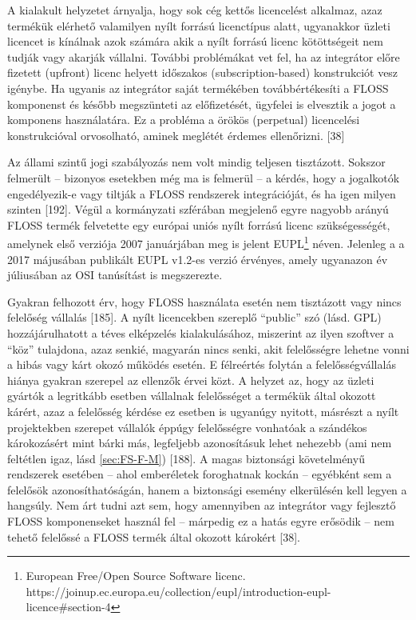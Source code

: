 \documentclass[12pt,magyar,a4paper,oneside]{scrreprt}
\begin{document}
A kialakult helyzetet árnyalja, hogy sok cég kettős licencelést
alkalmaz, azaz termékük elérhető valamilyen nyílt forrású licenctípus
alatt, ugyanakkor üzleti licencet is kínálnak azok számára akik a nyílt
forrású licenc kötöttségeit nem tudják vagy akarják vállalni. További
problémákat vet fel, ha az integrátor előre fizetett (upfront) licenc
helyett időszakos (subscription-based) konstrukciót vesz igénybe. Ha
ugyanis az integrátor saját termékében továbbértékesíti a FLOSS
komponenst és később megszünteti az előfizetését, ügyfelei is elvesztik
a jogot a komponens használatára. Ez a probléma a örökös (perpetual)
licencelési konstrukcióval orvosolható, aminek meglétét érdemes
ellenőrizni. {[}38{]}

Az állami szintű jogi szabályozás nem volt mindig teljesen tisztázott.
Sokszor felmerült -- bizonyos esetekben még ma is felmerül -- a kérdés,
hogy a jogalkotók engedélyezik-e vagy tiltják a FLOSS rendszerek
integrációját, és ha igen milyen szinten {[}192{]}. Végül a kormányzati
szférában megjelenő egyre nagyobb arányú FLOSS termék felvetette egy
európai uniós nyílt forrású licenc szükségességét, amelynek első
verziója 2007 januárjában meg is jelent EUPL\footnote{European Free/Open
  Source Software licenc.
  https://joinup.ec.europa.eu/collection/eupl/introduction-eupl-licence\#section-4}
néven. Jelenleg a a 2017 májusában publikált EUPL v1.2-es verzió
érvényes, amely ugyanazon év júliusában az OSI tanúsítást is
megszerezte.

Gyakran felhozott érv, hogy FLOSS használata esetén nem tisztázott vagy
nincs felelőség vállalás {[}185{]}. A nyílt licencekben szereplő
``public'' szó (lásd. GPL) hozzájárulhatott a téves elképzelés
kialakulásához, miszerint az ilyen szoftver a ``köz'' tulajdona, azaz
senkié, magyarán nincs senki, akit felelősségre lehetne vonni a hibás
vagy kárt okozó működés esetén. E félreértés folytán a
felelősségvállalás hiánya gyakran szerepel az ellenzők érvei közt. A
helyzet az, hogy az üzleti gyártók a legritkább esetben vállalnak
felelősséget a termékük által okozott kárért, azaz a felelősség kérdése
ez esetben is ugyanúgy nyitott, másrészt a nyílt projektekben szerepet
vállalók éppúgy felelősségre vonhatóak a szándékos károkozásért mint
bárki más, legfeljebb azonosításuk lehet nehezebb (ami nem feltétlen
igaz, lásd \ref{sec:FS-F-M}) {[}188{]}. A magas biztonsági követelményű
rendszerek esetében -- ahol emberéletek foroghatnak kockán -- egyébként
sem a felelősök azonosíthatóságán, hanem a biztonsági esemény
elkerülésén kell legyen a hangsúly. Nem árt tudni azt sem, hogy
amennyiben az integrátor vagy fejlesztő FLOSS komponenseket használ fel
-- márpedig ez a hatás egyre erősödik -- nem tehető felelőssé a FLOSS
termék által okozott károkért {[}38{]}.
\end{document}
